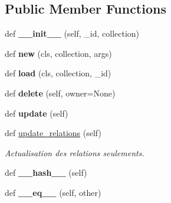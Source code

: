 \subsection*{Public Member Functions}
\begin{DoxyCompactItemize}
\item 
\mbox{\label{classSource_1_1core_1_1data_1_1Data_aabb409fc5f61a6cc4958785d97ead581}} 
def {\bfseries \+\_\+\+\_\+init\+\_\+\+\_\+} (self, \+\_\+id, collection)
\item 
\mbox{\label{classSource_1_1core_1_1data_1_1Data_a238106c23f9485029a6b7a5468f55045}} 
def {\bfseries new} (cls, collection, args)
\item 
\mbox{\label{classSource_1_1core_1_1data_1_1Data_a33f5cd6a28cc05f318226d7212fd8c2e}} 
def {\bfseries load} (cls, collection, \+\_\+id)
\item 
\mbox{\label{classSource_1_1core_1_1data_1_1Data_a12c16d466abfbf9974f6357fc805a0f5}} 
def {\bfseries delete} (self, owner=None)
\item 
\mbox{\label{classSource_1_1core_1_1data_1_1Data_a6630f7e7d66c3b7966a78c727acb9368}} 
def {\bfseries update} (self)
\item 
def \mbox{\hyperlink{classSource_1_1core_1_1data_1_1Data_a234b982c5580ac03d31f4e8db8ee87a5}{update\+\_\+relations}} (self)
\begin{DoxyCompactList}\small\item\em Actualisation des relations seulements. \end{DoxyCompactList}\item 
\mbox{\label{classSource_1_1core_1_1data_1_1Data_adf7a236f85f581437fc62a8319b6d083}} 
def {\bfseries \+\_\+\+\_\+hash\+\_\+\+\_\+} (self)
\item 
\mbox{\label{classSource_1_1core_1_1data_1_1Data_a3616f6e7c12a6463757879c9263fddbd}} 
def {\bfseries \+\_\+\+\_\+eq\+\_\+\+\_\+} (self, other)
\end{DoxyCompactItemize}
